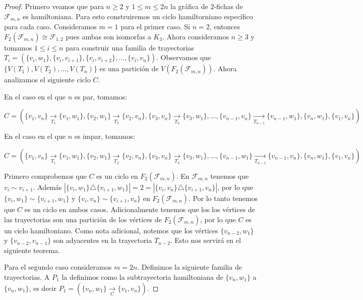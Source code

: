 \begin{proof}
    Primero veamos que para $n \geq 2$ y $1 \leq m \leq 2n$ la gr\'afica de
    $2$-fichas de $\mathcal{F}_{m,n}$ es hamiltoniana. Para esto construiremos
    un ciclo hamiltorniano espec\'ifico para cada caso. Consideramos $m=1$ para
    el primer caso. Si $n=2$, entonces $F_2(\mathcal{F}_{m,n}) \cong
    \mathcal{F}_{1,2}$ pues ambas son isomorfas a $K_3$. Ahora consideramos $n
    \geq 3$ y tomamos $1 \leq i \leq n$ para construir una familia de
    trayectorias $T_i=(\{v_i,w_1\},\{v_i,v_{i+1}\},\{v_i,v_{i+2}\},\dots,
    \{v_i,v_n\})$. Observamos que $\{V(T_1),V(T_2),\dots, V(T_n)\}$ es una
    partici\'on de $V(F_2(\mathcal{F}_{m,n}))$. %
    Ahora analizamos el siguiente ciclo $C$.
    
    En el caso en el que $n$ es par, tomamos:

    $C=(\{v_1,v_n\} \xrightarrow[T_1]{}\{v_1,w_1\},\{v_2,w_1\}
    \xrightarrow[T_2]{}\{v_2,v_n\},\{v_3,v_n\} \xrightarrow[T_3]{}\{v_3,w_1\},
    \dots, \{v_{n-1},v_n\}
    \xrightarrow[T_{n-1}]{}\{v_{n-1},w_1\},\{v_n,w_1\},\{v_1,v_n\})$

    En el caso en el que $n$ es impar, tomamos:

    $C=(\{v_1,v_n\} \xrightarrow[T_1]{}\{v_1,w_1\},\{v_2,w_1\}
    \xrightarrow[T_2]{}\{v_2,v_n\},\{v_3,v_n\} \xrightarrow[T_3]{}\{v_3,w_1\},
    \dots, \{v_{n-1},w_1\}
    \xrightarrow[T_{n-1}]{}\{v_{n-1},v_n\},\{v_n,w_1\},\{v_1,v_n\})$

    Primero comprobemos que $C$ es un ciclo en $F_2(\mathcal{F}_{m,n})$. En $\mathcal{F}_{m,n}$
    tenemos que $v_i \sim v_{i+1}$. Adem\'as $|\{v_i,w_1\}\triangle
    \{v_{i+1},w_1\}|=2 =|\{v_i,v_n\}\triangle \{v_{i+1},v_n\}|$, por lo que
    $\{v_i,w_1\}\sim \{v_{i+1},w_1\}$ y $\{v_i,v_n\}\sim \{v_{i+1},v_n\}$ en
    $F_2(\mathcal{F}_{m,n})$. Por lo tanto tenemos que $C$ es un ciclo en ambos casos.
    Adicionalmente tenemos que los los v\'ertices de las trayectorias son una
    partici\'on de los v\'ertices de $F_2(\mathcal{F}_{m,n})$, por lo que $C$ es un ciclo
    hamiltoniano. Como nota adicional, notemos que los v\'ertices
    $\{v_{n-2},w_1\}$ y $\{v_{n-2},v_{n-1}\}$ son adyacentes en la trayectoria
    $T_{n-2}$. Esto nos servir\'a en el siguiente teorema.

    Para el segundo caso consideramos $m=2n$. Definimos la siguiente familia de
    trayectorias. A $P_1$ la definimos como la subtrayectoria hamiltoniana de
    $\{v_n,w_1\}$ a $\{v_n,w_1\}$, es decir $P_1= (\{v_n,w_1\}
    \xrightarrow[C]{}\{v_1,v_n\})$. 
    

\end{proof}
